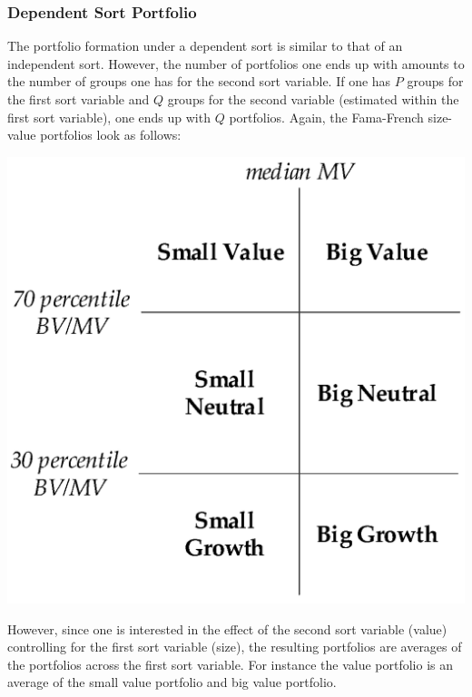 \documentclass[xcolor=dvipsnames, english, 8pt]{beamer}
\begin{document}
\begin{frame}
    \frametitle{Dependent Sort Portfolio}
    The portfolio formation under a dependent sort is similar to that of an independent sort. However, the number of portfolios one ends up with amounts to the number of groups one has for the second sort variable. If one has $P$ groups for the first sort variable and $Q$ groups for the second variable (estimated within the first sort variable), one ends up with $Q$ portfolios. Again, the Fama-French size-value portfolios look as follows:\vspace{0.25cm} \\

    \begin{center}
        \includegraphics[scale=0.75]{sorts1}\vspace{0.25cm}\\
    \end{center}
However, since one is interested in the effect of the second sort variable (value) controlling for the first sort variable (size), the resulting portfolios are {\color{ubRed} averages of the portfolios across the first sort variable}. For instance the value portfolio is an average of the small value portfolio and big value portfolio.
\end{frame}
\end{document}

